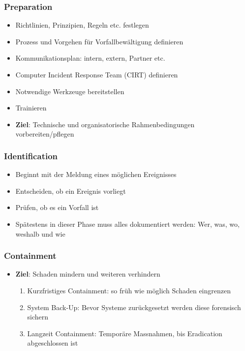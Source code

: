 \subsubsection{Preparation}
\begin{itemize}
    \item Richtlinien, Prinzipien, Regeln etc. festlegen
    \item Prozess und Vorgehen für Vorfallbewältigung definieren
    \item Kommunikationsplan: intern, extern, Partner etc.
    \item Computer Incident Response Team (CIRT) definieren
    \item Notwendige Werkzeuge bereitstellen
    \item Trainieren
    \item \textbf{Ziel}: Technische und organisatorische Rahmenbedingungen vorbereiten/pflegen
\end{itemize}

\subsubsection{Identification}
\begin{itemize}
    \item Beginnt mit der Meldung eines möglichen Ereignisses
    \item Entscheiden, ob ein Ereignis vorliegt
    \item Prüfen, ob es ein Vorfall ist
    \item Spätestens in dieser Phase muss alles dokumentiert werden: Wer, was, wo, weshalb und wie
\end{itemize}

\subsubsection{Containment}
\begin{itemize}
    \item \textbf{Ziel}: Schaden mindern und weiteren verhindern
    \begin{enumerate}
        \item Kurzfristiges Containment: so früh wie möglich Schaden eingrenzen
        \item System Back-Up: Bevor Systeme zurückgesetzt werden diese forensisch sichern
        \item Langzeit Containment: Temporäre Massnahmen, bis Eradication abgeschlossen ist
    \end{enumerate}
\end{itemize}

